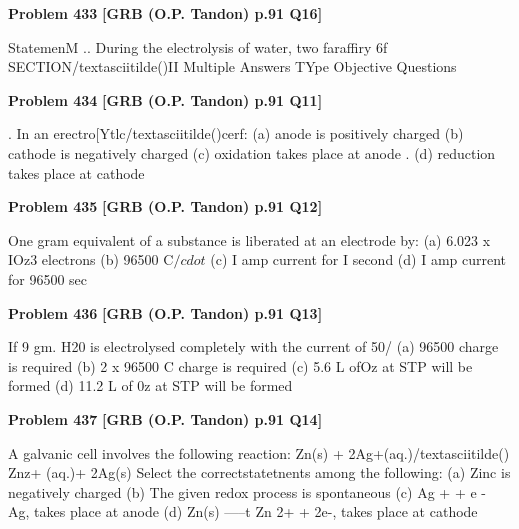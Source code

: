 \begin{problembox}
\textbf{Problem 433} \hfill \textbf{[GRB (O.P. Tandon) p.91 Q16]}
\label{q:ext-grb_all_questions-433}

StatemenM .. During the electrolysis of water, two faraffiry 6f 
SECTION/textasciitilde()II 
Multiple Answers TYpe Objective Questions
\end{problembox}

\begin{problembox}
\textbf{Problem 434} \hfill \textbf{[GRB (O.P. Tandon) p.91 Q11]}
\label{q:ext-grb_all_questions-434}

. In an erectro[Ytlc/textasciitilde()cerf: 
(a) anode is positively charged 
(b) cathode is negatively charged 
(c) oxidation takes place at anode . 
(d) reduction takes place at cathode
\end{problembox}

\begin{problembox}
\textbf{Problem 435} \hfill \textbf{[GRB (O.P. Tandon) p.91 Q12]}
\label{q:ext-grb_all_questions-435}

One gram equivalent of a substance is liberated at an electrode 
by: 
(a) 6.023 x IOz3 electrons 
(b) 96500 C$/cdot$ 
(c) I amp current for I second 
(d) I amp current for 96500 sec
\end{problembox}

\begin{problembox}
\textbf{Problem 436} \hfill \textbf{[GRB (O.P. Tandon) p.91 Q13]}
\label{q:ext-grb_all_questions-436}

If 9 gm. H20 is electrolysed completely with the current of 
50/%
(a) 96500 charge is required 
(b) 2 x 96500 C charge is required 
(c) 5.6 L ofOz at STP will be formed 
(d) 11.2 L of 0z at STP will be formed
\end{problembox}

\begin{problembox}
\textbf{Problem 437} \hfill \textbf{[GRB (O.P. Tandon) p.91 Q14]}
\label{q:ext-grb_all_questions-437}

A galvanic cell involves the following reaction: 
Zn(s) + 2Ag+(aq.)/textasciitilde() Znz+ (aq.)+ 2Ag(s) 
Select the correctstatetnents among the following: 
(a) Zinc is negatively charged 
(b) The given redox process is spontaneous 
(c) Ag + + e -
Ag, takes place at anode 
(d) Zn(s) -----t Zn 2+ + 2e-, takes place at cathode
\end{problembox}

